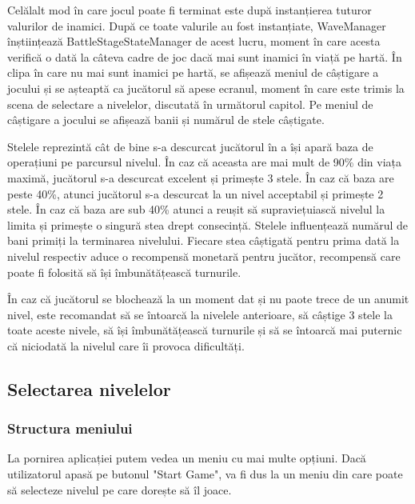 \documentclass[12pt, a4paper]{article}
\begin{document}
	Celălalt mod în care jocul poate fi terminat este după instanțierea tuturor valurilor de inamici. După ce toate valurile au fost instanțiate, WaveManager înștiințează BattleStageStateManager de acest lucru, moment în care acesta verifică o dată la câteva cadre de joc dacă mai sunt inamici în viață pe hartă. În clipa în care nu mai sunt inamici pe hartă, se afișează meniul de câștigare a jocului și se așteaptă ca jucătorul să apese ecranul, moment în care este trimis la scena de selectare a nivelelor, discutată în următorul capitol. Pe meniul de câștigare a jocului se afișează banii și numărul de stele câștigate. 
	\newline
	
	Stelele reprezintă cât de bine s-a descurcat jucătorul în a își apară baza de operațiuni pe parcursul nivelul. În caz că aceasta are mai mult de 90\% din viața maximă, jucătorul s-a descurcat excelent și primește 3 stele. În caz că baza are peste 40\%, atunci jucătorul s-a descurcat la un nivel acceptabil și primește 2 stele. În caz că baza are sub 40\% atunci a reușit să supraviețuiască nivelul la limita și primește o singură stea drept consecință. Stelele influențează numărul de bani primiți la terminarea nivelului. Fiecare stea câștigată pentru prima dată la nivelul respectiv aduce o recompensă monetară pentru jucător, recompensă care poate fi folosită să își îmbunătățească turnurile. 
	\newline
	
	În caz că jucătorul se blochează la un moment dat și nu paote trece de un anumit nivel, este recomandat să se întoarcă la nivelele anterioare, să câștige 3 stele la toate aceste nivele, să își îmbunătățească turnurile și să se întoarcă mai puternic că niciodată la nivelul care îi provoca dificultăți.
	
	
	
	
	
	\subsection{Selectarea nivelelor}
	\label{section: levelSelection}
	
	\subsubsection{Structura meniului}
	
	La pornirea aplicației putem vedea un meniu cu mai multe opțiuni. Dacă utilizatorul apasă pe butonul "Start Game", va fi dus la un meniu din care poate să selecteze nivelul pe care dorește să îl joace.
	
\end{document}

